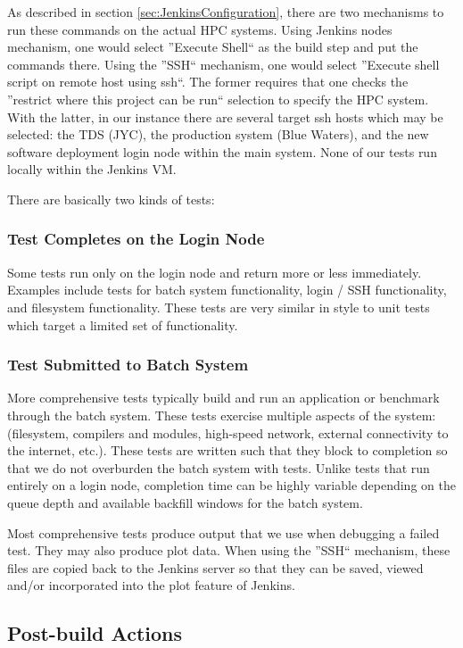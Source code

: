 \documentclass[10pt, conference, compsocconf]{IEEEtran}
\begin{document}
As described in section \ref{sec:JenkinsConfiguration}, there are two mechanisms to run these commands on the actual HPC systems. 
Using Jenkins nodes mechanism, one would select ''Execute Shell`` as the build step and put the commands there. Using the ''SSH`` mechanism, one would select ''Execute shell script on remote host using ssh``. 
The former requires that one checks the ''restrict where this project can be run`` selection to specify the HPC system. 
With the latter, in our instance there are several target ssh hosts which may be selected: the TDS (JYC), the production system (Blue Waters), and the new software deployment login node within the main system. 
None of our tests run locally within the Jenkins VM.

There are basically two kinds of tests: 

\subsubsection{Test Completes on the Login Node}
Some tests run only on the login node and return more or less immediately. 
Examples include tests for batch system functionality, login / SSH functionality, and filesystem functionality. 
These tests are very similar in style to unit tests which target a limited set of functionality.

\subsubsection{Test Submitted to Batch System}
More comprehensive tests typically build and run an application or benchmark through the batch system.  
These tests exercise multiple aspects of the system: (filesystem, compilers and modules, high-speed network, external connectivity to the internet, etc.). 
These tests are written such that they block to completion so that we do not overburden the batch system with tests. 
Unlike tests that run entirely on a login node, completion time can be highly variable depending on the queue depth and available backfill windows for the batch system.
 

Most comprehensive tests produce output that we use when debugging a failed test. 
They may also produce plot data. When using the ''SSH`` mechanism, these files are copied back to the Jenkins server so that they can be saved, viewed and/or incorporated into the plot feature of Jenkins. 
 
\subsection{Post-build Actions}
\end{document}
